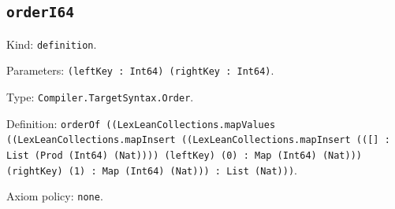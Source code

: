 \documentclass[11pt]{article}
\begin{document}
\subsection*{\texttt{orderI64}}
\noindent Kind: \texttt{definition}.\par
\noindent Parameters: \texttt{(leftKey : Int64) (rightKey : Int64)}.\par
\noindent Type: \texttt{Compiler.TargetSyntax.Order}.\par
\noindent Definition: \texttt{orderOf ((LexLeanCollections.mapValues ((LexLeanCollections.mapInsert ((LexLeanCollections.mapInsert (([] : List (Prod (Int64) (Nat)))) (leftKey) (0) : Map (Int64) (Nat))) (rightKey) (1) : Map (Int64) (Nat))) : List (Nat)))}.\par
\noindent Axiom policy: \texttt{none}.\par
\end{document}
